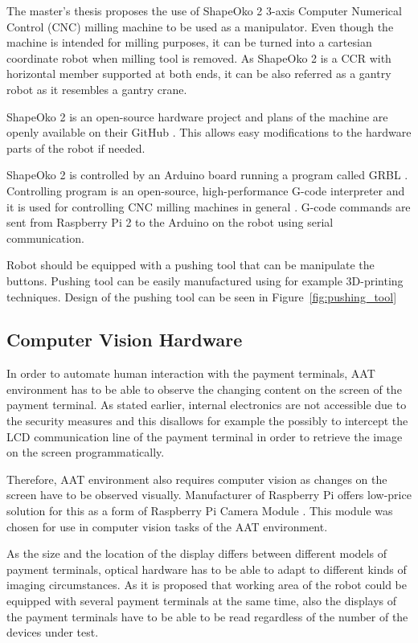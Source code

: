 The master's thesis proposes the use of ShapeOko 2 3-axis Computer Numerical Control (CNC) milling machine \citep{shapeoko} to be used as a manipulator. Even though the machine is intended for milling purposes, it can be turned into a cartesian coordinate robot when milling tool is removed. As ShapeOko 2 is a CCR with horizontal member supported at both ends, it can be also referred as a gantry robot as it resembles a gantry crane.

ShapeOko 2 is an open-source hardware project and plans of the machine are openly available on their GitHub \citep{shapeoko_git}. This allows easy modifications to the hardware parts of the robot if needed.

ShapeOko 2 is controlled by an Arduino board running a program called GRBL \citep{grbl}. Controlling program is an open-source, high-performance G-code interpreter and it is used for controlling CNC milling machines in general \citep{shapeoko}. G-code commands are sent from Raspberry Pi 2 to the Arduino on the robot using serial communication.

Robot should be equipped with a pushing tool that can be manipulate the buttons. Pushing tool can be easily manufactured using for example 3D-printing techniques. Design of the pushing tool can be seen in Figure~\ref{fig:pushing_tool}

\FloatBarrier
\subsection{Computer Vision Hardware}
\label{subsection:computer vision hardware}

In order to automate human interaction with the payment terminals, AAT environment has to be able to observe the changing content on the screen of the payment terminal. As stated earlier, internal electronics are not accessible due to the security measures and this disallows for example the possibly to intercept the LCD communication line of the payment terminal in order to retrieve the image on the screen programmatically.

Therefore, AAT environment also requires computer vision as changes on the screen have to be observed visually. Manufacturer of Raspberry Pi offers low-price solution for this as a form of Raspberry Pi Camera Module \citep{raspberry_camera}. This module was chosen for use in computer vision tasks of the AAT environment.

As the size and the location of the display differs between different models of payment terminals, optical hardware has to be able to adapt to different kinds of imaging circumstances. As it is proposed that working area of the robot could be equipped with several payment terminals at the same time, also the displays of the payment terminals have to be able to be read regardless of the number of the devices under test.

